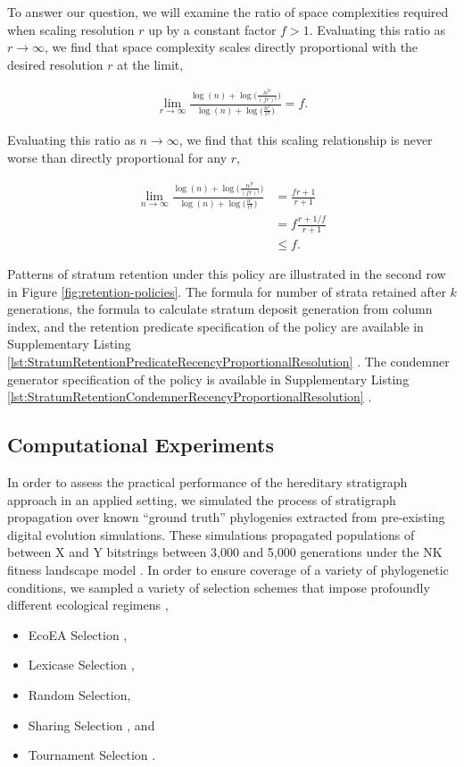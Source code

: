 To answer our question, we will examine the ratio of space complexities required when scaling resolution $r$ up by a constant factor $f > 1$.
Evaluating this ratio as $r \to \infty$, we find that space complexity scales directly proportional with the desired resolution $r$ at the limit,

\begin{align*}
\lim_{r \to \infty}
\frac{
  \log(n) + \log\Big(\frac{n^{fr}}{(fr)!}\Big)
}{
  \log(n) + \log\Big(\frac{n^r}{r!}\Big)
}
= f.
\end{align*}

Evaluating this ratio as $n \to \infty$, we find that this scaling relationship is never worse than directly proportional for any $r$,

\begin{align*}
\lim_{n \to \infty}
\frac{
  \log(n) + \log\Big(\frac{n^{fr}}{(fr)!}\Big)
}{
  \log(n) + \log\Big(\frac{n^r}{r!}\Big)
}
&= \frac{fr+1}{r+1}\\
&= f\frac{r + 1/f}{r + 1}\\
&\leq f.
\end{align*}

Patterns of stratum retention under this policy are illustrated in the second row in Figure \ref{fig:retention-policies}.
The formula for number of strata retained after $k$ generations, the formula to calculate stratum deposit generation from column index, and the retention predicate specification of the policy are available in Supplementary Listing \ref{lst:StratumRetentionPredicateRecencyProportionalResolution} \citep{moreno2022hstratconceptsupplement}.
The condemner generator specification of the policy is available in Supplementary Listing \ref{lst:StratumRetentionCondemnerRecencyProportionalResolution} \citep{moreno2022hstratconceptsupplement}.


\subsection{Computational Experiments}

In order to assess the practical performance of the hereditary stratigraph approach in an applied setting, we simulated the process of stratigraph propagation over known ``ground truth'' phylogenies extracted from pre-existing digital evolution simulations.
These simulations propagated populations of between X and Y bitstrings between 3,000 and 5,000 generations under the NK fitness landscape model \citep{kauffman1989nk}.
In order to ensure coverage of a variety of phylogenetic conditions, we sampled a variety of selection schemes that impose profoundly different ecological regimens \citep{dolson2018ecological},
\begin{itemize}
  \item EcoEA Selection \citep{goings2012ecology},
  \item Lexicase Selection \citep{helmuth2014solving},
  \item Random Selection,
  \item Sharing Selection \citep{goldberg1987genetic}, and
  \item Tournament Selection \citep{miller1995genetic}.
\end{itemize}

